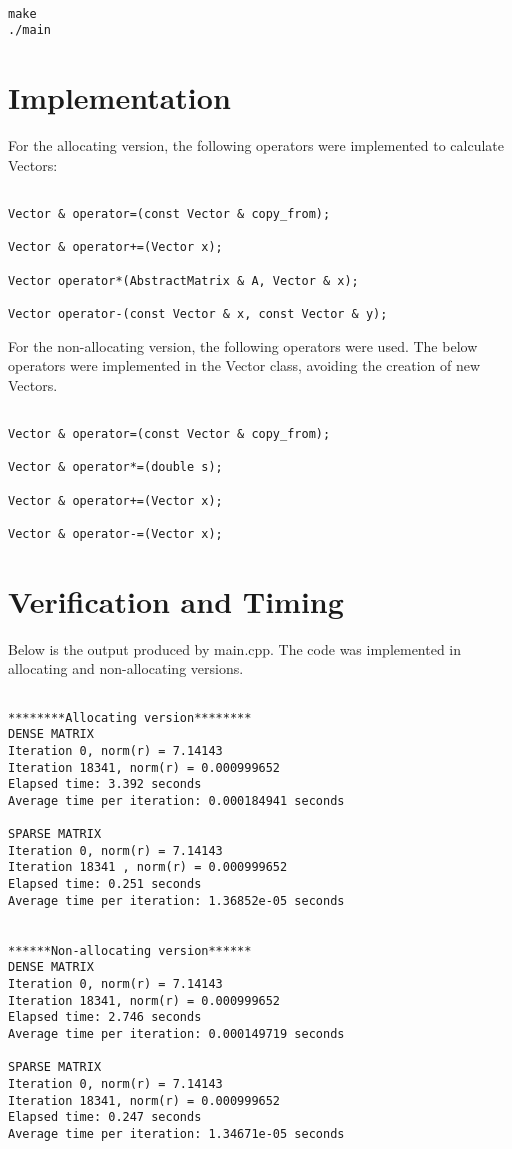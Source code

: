 \documentclass{article}
\begin{document}
\begin{verbatim}

make
./main

\end{verbatim}

\section*{Implementation}

For the allocating version, the following operators were implemented to calculate Vectors:

\begin{verbatim}

Vector & operator=(const Vector & copy_from);

Vector & operator+=(Vector x);

Vector operator*(AbstractMatrix & A, Vector & x);

Vector operator-(const Vector & x, const Vector & y);

\end{verbatim}

For the non-allocating version, the following operators were used. The below operators were implemented in the Vector class, avoiding the creation of new Vectors.

\begin{verbatim}

Vector & operator=(const Vector & copy_from);

Vector & operator*=(double s);

Vector & operator+=(Vector x);

Vector & operator-=(Vector x);

\end{verbatim}


\section*{Verification and Timing}

Below is the output produced by main.cpp. The code was implemented in allocating and non-allocating versions.

\begin{verbatim}

********Allocating version********
DENSE MATRIX
Iteration 0, norm(r) = 7.14143
Iteration 18341, norm(r) = 0.000999652
Elapsed time: 3.392 seconds
Average time per iteration: 0.000184941 seconds

SPARSE MATRIX
Iteration 0, norm(r) = 7.14143
Iteration 18341 , norm(r) = 0.000999652
Elapsed time: 0.251 seconds
Average time per iteration: 1.36852e-05 seconds


******Non-allocating version******
DENSE MATRIX
Iteration 0, norm(r) = 7.14143
Iteration 18341, norm(r) = 0.000999652
Elapsed time: 2.746 seconds
Average time per iteration: 0.000149719 seconds

SPARSE MATRIX
Iteration 0, norm(r) = 7.14143
Iteration 18341, norm(r) = 0.000999652
Elapsed time: 0.247 seconds
Average time per iteration: 1.34671e-05 seconds

\end{verbatim}
\end{document}
